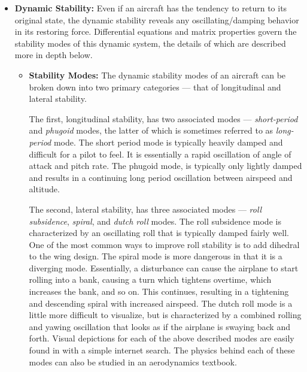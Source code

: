 \documentclass{report}
\begin{document}
\begin{itemize}
\begin{itemize}
            One other common way to notate these stability derivatives (aside from the format seen in Equation~\ref{eq:aerodynamic_center_condition}) is $C_{m,\alpha}$ (read as $C_m$ $\alpha$). 
            This same notational format can be followed for any of the commonly used stability derivatives.
            Further analysis of these partial derivatives will be in the exploration section of the document. 
        \end{itemize}

    \item[] \textbf{Dynamic Stability:} Even if an aircraft has the tendency to return to its original state, the dynamic stability reveals any oscillating/damping behavior in its restoring force.
    Differential equations and matrix properties govern the stability modes of this dynamic system, the details of which are described more in depth below.
        \begin{itemize}
            \item[] \textbf{Stability Modes:} The dynamic stability modes of an aircraft can be broken down into two primary categories --- that of longitudinal and lateral stability.
            
            The first, longitudinal stability, has two associated modes --- \textit{short-period} and \textit{phugoid} modes, the latter of which is sometimes referred to as \textit{long-period} mode. The short period mode is typically heavily damped and difficult for a pilot to feel.
            It is essentially a rapid oscillation of angle of attack and pitch rate. The phugoid mode, is typically only lightly damped and results in a continuing long period oscillation between airspeed and altitude.

            The second, lateral stability, has three associated modes --- \textit{roll subsidence}, \textit{spiral}, and \textit{dutch roll} modes. The roll subsidence mode is characterized by an oscillating roll that is typically damped fairly well. One of the most common ways to improve roll stability is to add dihedral to the wing design.
            The spiral mode is more dangerous in that it is a diverging mode. Essentially, a disturbance can cause the airplane to start rolling into a bank, causing a turn which tightens overtime, which increases the bank, and so on. This continues, resulting in a tightening and descending spiral with increased airspeed.
            The dutch roll mode is a little more difficult to visualize, but is characterized by a combined rolling and yawing oscillation that looks as if the airplane is swaying back and forth. Visual depictions for each of the above described modes are easily found in with a simple internet search.
            The physics behind each of these modes can also be studied in an aerodynamics textbook.



\end{itemize}
\end{itemize}
\end{document}
